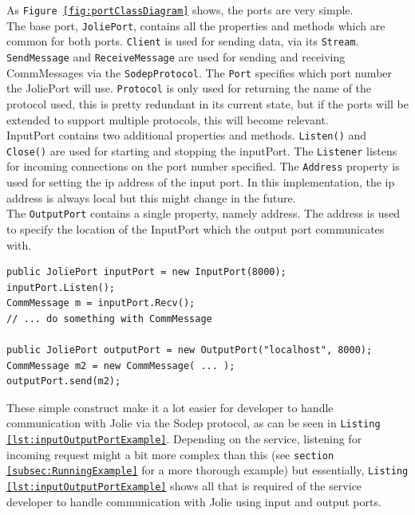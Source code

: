 \documentclass[12pt,a4paper]{article}
\begin{document}
As \texttt{Figure \ref{fig:portClassDiagram}} shows, the ports are very simple.\\
The base port, \texttt{JoliePort}, contains all the properties and methods which are common for both ports. \texttt{Client} is used for sending data, via its \texttt{Stream}. \texttt{SendMessage} and \texttt{ReceiveMessage} are used for sending and receiving CommMessages via the \texttt{SodepProtocol}. The \texttt{Port} specifies which port number the JoliePort will use. \texttt{Protocol} is only used for returning the name of the protocol used, this is pretty redundant in its current state, but if the ports will be extended to support multiple protocols, this will become relevant.\\
InputPort contains two additional properties and methods. \texttt{Listen()} and \texttt{Close()} are used for starting and stopping the inputPort. The \texttt{Listener} listens for incoming connections on the port number specified. The \texttt{Address} property is used for setting the ip address of the input port. In this implementation, the ip address is always local but this might change in the future. \\
The \texttt{OutputPort} contains a single property, namely address. The address is used to specify the location of the InputPort which the output port communicates with.\\

\begin{lstlisting}[caption={Example usage of input/output port in C\#},label={lst:inputOutputPortExample}]
public JoliePort inputPort = new InputPort(8000);
inputPort.Listen();
CommMessage m = inputPort.Recv();
// ... do something with CommMessage

public JoliePort outputPort = new OutputPort("localhost", 8000);
CommMessage m2 = new CommMessage( ... );
outputPort.send(m2);
\end{lstlisting}

These simple construct make it a lot easier for developer to handle communication with Jolie via the Sodep protocol, as can be seen in \texttt{Listing \ref{lst:inputOutputPortExample}}. Depending on the service, listening for incoming request might a bit more complex than this (see \texttt{section \ref{subsec:RunningExample}} for a more thorough example) but essentially, \texttt{Listing \ref{lst:inputOutputPortExample}} shows all that is required of the service developer to handle communication with Jolie using input and output ports. \\
\end{document}
